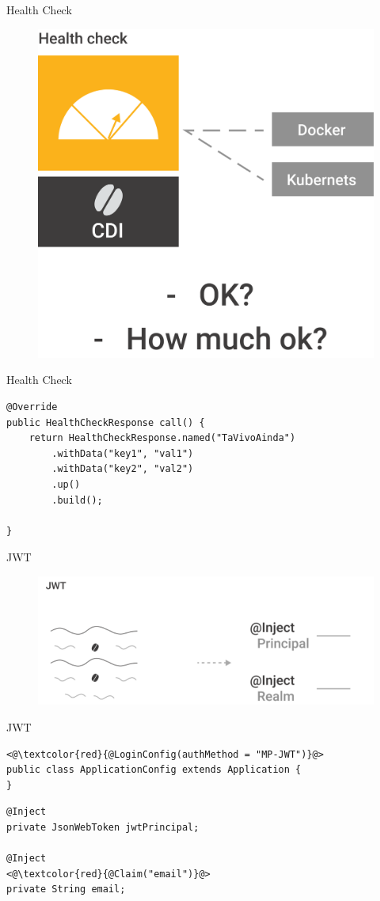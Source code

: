 \documentclass[aspectratio=169]{beamer}
\begin{document}
\begin{frame}{Health Check}
\begin{figure}
	\centering
	\includegraphics[width=0.75\linewidth]{Images/healthcheck}
\end{figure}
\end{frame}

\begin{frame}[fragile]{Health Check}
\begin{lstlisting}
@Override
public HealthCheckResponse call() {
	return HealthCheckResponse.named("TaVivoAinda")
		.withData("key1", "val1")
		.withData("key2", "val2")
		.up()
		.build();

}
\end{lstlisting}

\end{frame}


\begin{frame}{JWT}
\begin{figure}
	\centering
	\includegraphics[width=0.9\linewidth]{Images/jwt}
\end{figure}
\end{frame}


\begin{frame}[fragile]{JWT}

\begin{lstlisting}
<@\textcolor{red}{@LoginConfig(authMethod = "MP-JWT")}@>
public class ApplicationConfig extends Application {
}
\end{lstlisting}

\begin{lstlisting}
@Inject
private JsonWebToken jwtPrincipal;

@Inject
<@\textcolor{red}{@Claim("email")}@>
private String email;
\end{lstlisting}
\end{frame}
\end{document}
